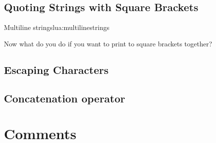 \subsection{Quoting Strings with Square Brackets}

\begin{texexample}{Multiline strings}{lua:multilinestrings}
\end{texexample}

Now what do you do if you want to print to square brackets together?

\begin{tcblisting}{}
\ttfamily {}
\end{tcblisting}

\subsection{Escaping Characters}

\begin{tcblisting}{}
\ttfamily {}
\end{tcblisting}


\begin{tcblisting}{}
\ttfamily {}
\end{tcblisting}

\subsection{Concatenation operator}

\begin{tcblisting}{}
\ttfamily {}
\end{tcblisting}

\section{Comments}
\begin{tcblisting}{}
\ttfamily {}
\end{tcblisting}

